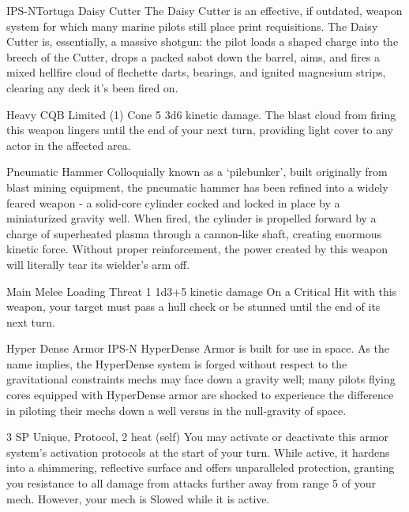 \begin{mech}{IPS-N}{Tortuga}
Daisy Cutter
The Daisy Cutter is an effective, if outdated, weapon system for which many marine pilots still place print requisitions. The Daisy Cutter is, essentially, a massive shotgun: the pilot loads a shaped charge into the breech of the Cutter, drops a packed sabot down the barrel, aims, and fires a mixed hellfire cloud of flechette darts, bearings, and ignited magnesium strips, clearing any deck it’s been fired on. 

Heavy CQB
Limited (1)
Cone 5
3d6 kinetic damage. 
The blast cloud from firing this weapon lingers until the end of your next turn, providing light cover to any actor in the affected area.

Pneumatic Hammer
Colloquially known as a ‘pilebunker’, built originally from blast mining equipment, the pneumatic hammer has been refined into a widely feared weapon - a solid-core cylinder cocked and locked in place by a miniaturized gravity well. When fired, the cylinder is propelled forward by a charge of superheated plasma through a cannon-like shaft, creating enormous kinetic force. Without proper reinforcement, the power created by this weapon will literally tear its wielder’s arm off.

Main Melee
Loading
Threat 1
1d3+5 kinetic damage
On a Critical Hit with this weapon, your target must pass a hull check or be stunned until the end of its next turn.

Hyper Dense Armor
IPS-N HyperDense Armor is built for use in space. As the name implies, the HyperDense system is forged without respect to the gravitational constraints mechs may face down a gravity well; many pilots flying cores equipped with HyperDense armor are shocked to experience the difference in piloting their mechs down a well versus in the null-gravity of space. 

3 SP
Unique, Protocol, 2 heat (self)
You may activate or deactivate this armor system’s activation protocols at the start of your turn. While active, it hardens into a shimmering, reflective surface and offers unparalleled protection, granting you resistance to all damage from attacks further away from range 5 of your mech. However, your mech is Slowed while it is active. 


\end{mech}
